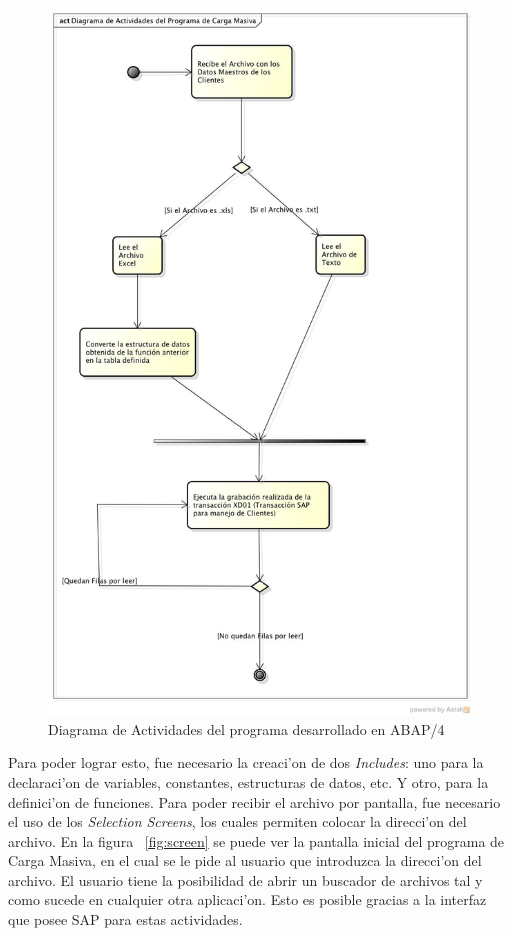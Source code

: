 \begin{figure}[H]
\centering
\includegraphics[scale=0.38,type=jpg,ext=.jpg,read=.jpg]{figures/DiagramaActividades}
\caption{Diagrama de Actividades del programa desarrollado en ABAP/4}
\label{fig:actividades}
\end{figure}
\indent Para poder lograr esto, fue necesario la creaci'on de dos \textit{Includes}: uno para la declaraci'on de variables, constantes, estructuras de datos, etc. Y otro, para la definici'on de funciones.
\newline
\newline
\indent Para poder recibir el archivo por pantalla, fue necesario el uso de los \textit{Selection Screens}, los cuales permiten colocar la direcci'on del archivo. En la figura ~\ref{fig:screen} se puede ver la pantalla inicial del programa de Carga Masiva, en el cual se le pide al usuario que introduzca la direcci'on del archivo. El usuario tiene la posibilidad de abrir un buscador de archivos tal y como sucede en cualquier otra aplicaci'on. Esto es posible gracias a la interfaz que posee SAP para estas actividades.
